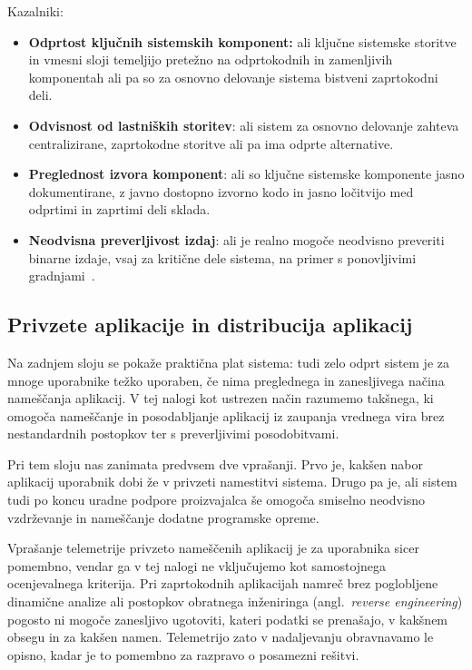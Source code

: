 \documentclass[a4paper,12pt,openright]{book}
\begin{document}
Kazalniki:
\begin{itemize}
  \item \textbf{Odprtost ključnih sistemskih komponent:} ali ključne sistemske storitve in vmesni sloji temeljijo pretežno na odprtokodnih in zamenljivih komponentah ali pa so za osnovno delovanje sistema bistveni zaprtokodni deli.
  \item \textbf{Odvisnost od lastniških storitev}: ali sistem za osnovno delovanje zahteva centralizirane, zaprtokodne storitve ali pa ima odprte alternative.
  \item \textbf{Preglednost izvora komponent}: ali so ključne sistemske komponente jasno dokumentirane, z javno dostopno izvorno kodo in jasno ločitvijo med odprtimi in zaprtimi deli sklada.
  \item \textbf{Neodvisna preverljivost izdaj}: ali je realno mogoče neodvisno preveriti binarne izdaje, vsaj za kritične dele sistema, na primer s ponovljivimi gradnjami~\cite{reproducible_builds}.
\end{itemize}

\subsection{Privzete aplikacije in distribucija aplikacij}
\label{subsec:model_apps}

Na zadnjem sloju se pokaže praktična plat sistema: tudi zelo odprt sistem je za mnoge uporabnike težko uporaben, če nima preglednega in zanesljivega načina nameščanja aplikacij.
V tej nalogi kot ustrezen način razumemo takšnega, ki omogoča nameščanje in posodabljanje aplikacij iz zaupanja vrednega vira brez nestandardnih postopkov ter s preverljivimi posodobitvami.

Pri tem sloju nas zanimata predvsem dve vprašanji.
Prvo je, kakšen nabor aplikacij uporabnik dobi že v privzeti namestitvi sistema.
Drugo pa je, ali sistem tudi po koncu uradne podpore proizvajalca še omogoča smiselno neodvisno vzdrževanje in nameščanje dodatne programske opreme.

Vprašanje telemetrije privzeto nameščenih aplikacij je za uporabnika sicer pomembno, vendar ga v tej nalogi ne vključujemo kot samostojnega ocenjevalnega kriterija.
Pri zaprtokodnih aplikacijah namreč brez poglobljene dinamične analize ali postopkov obratnega inženiringa (angl.~\textit{reverse engineering}) pogosto ni mogoče zanesljivo ugotoviti, kateri podatki se prenašajo, v kakšnem obsegu in za kakšen namen.
Telemetrijo zato v nadaljevanju obravnavamo le opisno, kadar je to pomembno za razpravo o posamezni rešitvi.
\end{document}
